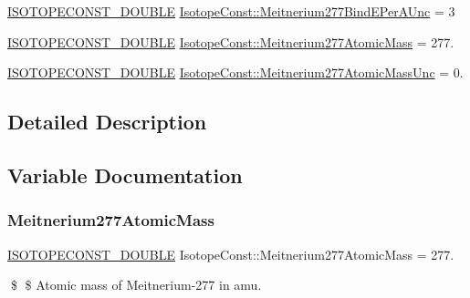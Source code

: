 \begin{DoxyCompactItemize}
\mbox{\hyperlink{group___isotope_const-_macros_ga8f45a7272ce02c0b4c65c44636ed719a}{I\+S\+O\+T\+O\+P\+E\+C\+O\+N\+S\+T\+\_\+\+D\+O\+U\+B\+LE}} \mbox{\hyperlink{group___isotope_const-_meitnerium-_mt277_ga5209597515550fa7a7723e53aaa29bc7}{Isotope\+Const\+::\+Meitnerium277\+Bind\+E\+Per\+A\+Unc}} = 3
\item 
\mbox{\hyperlink{group___isotope_const-_macros_ga8f45a7272ce02c0b4c65c44636ed719a}{I\+S\+O\+T\+O\+P\+E\+C\+O\+N\+S\+T\+\_\+\+D\+O\+U\+B\+LE}} \mbox{\hyperlink{group___isotope_const-_meitnerium-_mt277_gaef33c10a1c3b445eb9ef7c54f94ba555}{Isotope\+Const\+::\+Meitnerium277\+Atomic\+Mass}} = 277.
\item 
\mbox{\hyperlink{group___isotope_const-_macros_ga8f45a7272ce02c0b4c65c44636ed719a}{I\+S\+O\+T\+O\+P\+E\+C\+O\+N\+S\+T\+\_\+\+D\+O\+U\+B\+LE}} \mbox{\hyperlink{group___isotope_const-_meitnerium-_mt277_gafe01a5d54fcb2dc53b9efd09af810d1a}{Isotope\+Const\+::\+Meitnerium277\+Atomic\+Mass\+Unc}} = 0.
\end{DoxyCompactItemize}


\subsection{Detailed Description}


\subsection{Variable Documentation}
\mbox{\label{group___isotope_const-_meitnerium-_mt277_gaef33c10a1c3b445eb9ef7c54f94ba555}} 
\subsubsection{\texorpdfstring{Meitnerium277\+Atomic\+Mass}{Meitnerium277AtomicMass}}
{\footnotesize\ttfamily \mbox{\hyperlink{group___isotope_const-_macros_ga8f45a7272ce02c0b4c65c44636ed719a}{I\+S\+O\+T\+O\+P\+E\+C\+O\+N\+S\+T\+\_\+\+D\+O\+U\+B\+LE}} Isotope\+Const\+::\+Meitnerium277\+Atomic\+Mass = 277.}

\$ \$ Atomic mass of Meitnerium-\/277 in amu. \mbox{\label{group___isotope_const-_meitnerium-_mt277_gafe01a5d54fcb2dc53b9efd09af810d1a}} 
